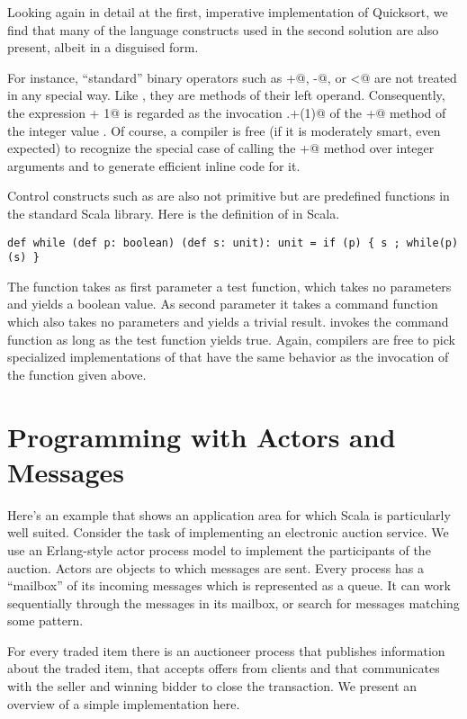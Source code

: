 \documentclass[11pt]{book}
\begin{document}
Looking again in detail at the first, imperative implementation of
Quicksort, we find that many of the language constructs used in the
second solution are also present, albeit in a disguised form.

For instance, ``standard'' binary operators such as \verb@+@,
\verb@-@, or \verb@<@ are not treated in any special way. Like
\verb@append@, they are methods of their left operand. Consequently,
the expression \verb@i + 1@ is regarded as the invocation
\verb@i.+(1)@ of the \verb@+@ method of the integer value \verb@x@.
Of course, a compiler is free (if it is moderately smart, even expected)
to recognize the special case of calling the \verb@+@ method over
integer arguments and to generate efficient inline code for it.

Control constructs such as \verb@while@ are also not primitive but are
predefined functions in the standard Scala library. Here is the
definition of \verb@while@ in Scala.
\begin{verbatim}
def while (def p: boolean) (def s: unit): unit = if (p) { s ; while(p)(s) }
\end{verbatim}
The \verb@while@ function takes as first parameter a test function,
which takes no parameters and yields a boolean value. As second
parameter it takes a command function which also takes no parameters
and yields a trivial result. \verb@while@ invokes the command function
as long as the test function yields true. Again, compilers are free to
pick specialized implementations of \verb@while@ that have the same
behavior as the invocation of the function given above.

\chapter{\label{chap:example-auction}Programming with Actors and Messages}

Here's an example that shows an application area for which Scala is
particularly well suited. Consider the task of implementing an
electronic auction service. We use an Erlang-style actor process
model to implement the participants of the auction. Actors are
objects to which messages are sent. Every process has a ``mailbox'' of
its incoming messages which is represented as a queue. It can work
sequentially through the messages in its mailbox, or search for
messages matching some pattern.

For every traded item there is an auctioneer process that publishes
information about the traded item, that accepts offers from clients
and that communicates with the seller and winning bidder to close the
transaction. We present an overview of a simple implementation
here.
\end{document}
